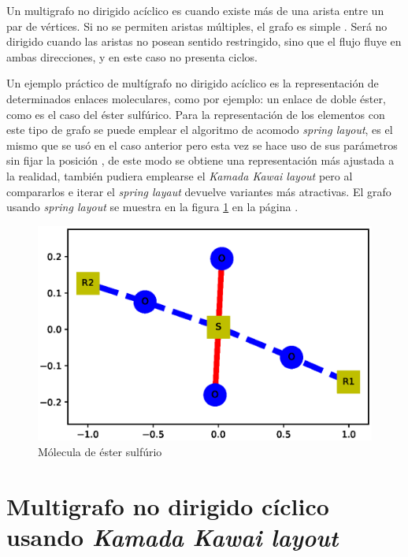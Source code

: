 \documentclass{article}
\begin{document}
Un multigrafo no dirigido acíclico es cuando existe más de una arista entre un par de vértices. Si no se permiten aristas múltiples, el grafo es simple \cite{Elisa}. Será no dirigido cuando las aristas no posean sentido restringido, sino que el flujo fluye en ambas direcciones, y en este caso no presenta ciclos.

Un ejemplo práctico de multígrafo no dirigido acíclico es la representación de determinados enlaces moleculares, como por ejemplo: un enlace de doble éster, como es el caso del éster sulfúrico. Para la representación de los elementos con este tipo de grafo se puede emplear el algoritmo de acomodo \textit{spring layout}, es el mismo que se usó en el caso anterior pero esta vez se hace uso de sus parámetros sin fijar la posición \cite{layout}, de este modo se obtiene una representación más ajustada a la realidad, también pudiera emplearse el \textit{Kamada Kawai layout} pero al compararlos e iterar el \textit{spring layaut} devuelve variantes más atractivas. El grafo usando \textit{spring layout} se muestra en la figura \ref{fig:Fig07} en la página \pageref{fig:Fig07}.

\newpage


\begin{figure}[htbp]
    \centering
    \includegraphics[scale=0.4]{imagenes1/Fig07.eps}
    \caption{Mólecula de éster sulfúrio}
    \label{fig:Fig07}
\end{figure}

\section{Multigrafo no dirigido cíclico usando \textit{Kamada Kawai layout}}
\end{document}
